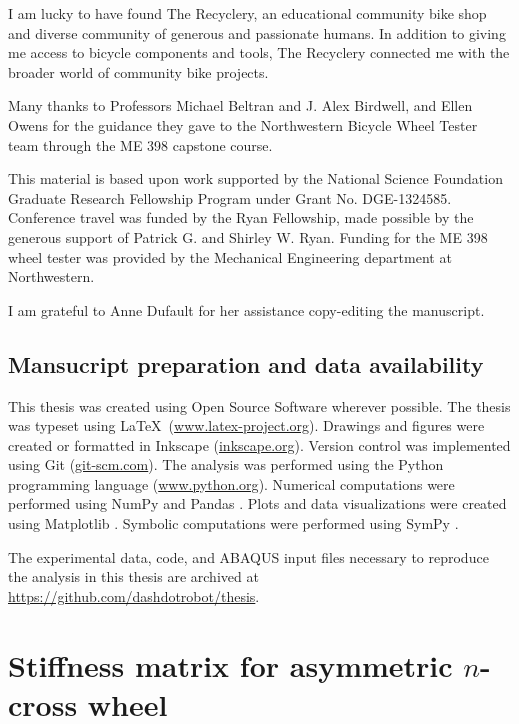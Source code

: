 \documentclass{nuthesis}
\begin{document}
I am lucky to have found The Recyclery, an educational community bike shop and diverse community of generous and passionate humans. In addition to giving me access to bicycle components and tools, The Recyclery connected me with the broader world of community bike projects.

Many thanks to Professors Michael Beltran and J. Alex Birdwell, and Ellen Owens for the guidance they gave to the Northwestern Bicycle Wheel Tester team through the ME 398 capstone course.

This material is based upon work supported by the National Science Foundation Graduate Research Fellowship Program under Grant No. DGE-1324585. Conference travel was funded by the Ryan Fellowship, made possible by the generous support of Patrick G. and Shirley W. Ryan. Funding for the ME 398 wheel tester was provided by the Mechanical Engineering department at Northwestern.

I am grateful to Anne Dufault for her assistance copy-editing the manuscript.

\section*{Mansucript preparation and data availability}
This thesis was created using Open Source Software wherever possible. The thesis was typeset using \LaTeX\, (\url{www.latex-project.org}). Drawings and figures were created or formatted in Inkscape (\url{inkscape.org}). Version control was implemented using Git (\url{git-scm.com}). The analysis was performed using the Python programming language (\url{www.python.org}). Numerical computations were performed using NumPy \cite{numpy} and Pandas \cite{pandas}. Plots and data visualizations were created using Matplotlib \cite{matplotlib}. Symbolic computations were performed using SymPy \cite{sympy}.

The experimental data, code, and ABAQUS input files necessary to reproduce the analysis in this thesis are archived at \url{https://github.com/dashdotrobot/thesis}.






\appendix

\printunsrtglossary[type=symbols, style=long, title={List of symbols}]

\chapter{Stiffness matrix for asymmetric $n$-cross wheel}
\label{app:kbar_asymm}

\end{document}
